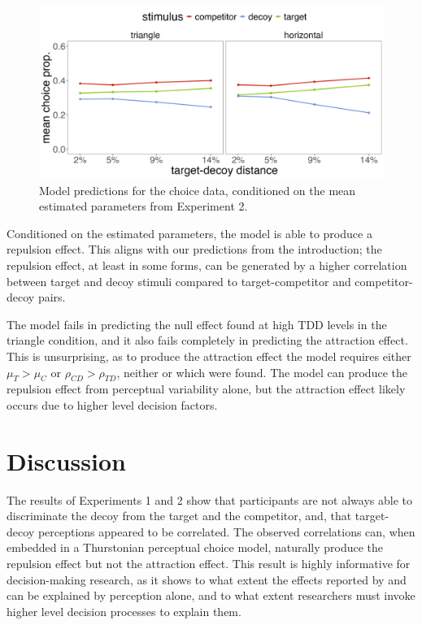 \begin{figure}
   \includegraphics[width=\textwidth]{figures/bayes_circle_area_sim_choice_sigma_constant_comp_effect.jpeg}
   \caption{Model predictions for the choice data, conditioned on the mean estimated parameters from Experiment 2.}
   \label{fig:e2_model_preds}
\end{figure}

Conditioned on the estimated parameters, the model is able to produce a repulsion effect. This aligns with our predictions from the introduction; the repulsion effect, at least in some forms, can be generated by a higher correlation between target and decoy stimuli compared to target-competitor and competitor-decoy pairs.

The model fails in predicting the null effect found at high TDD levels in the triangle condition, and it also fails completely in predicting the attraction effect. This is unsurprising, as to produce the attraction effect the model requires either $\mu_{T}>\mu_{C}$ or $\rho_{CD}>\rho_{TD}$, neither or which were found. The model can produce the repulsion effect from perceptual variability alone, but the attraction effect likely occurs due to higher level decision factors.

\section{Discussion}

The results of Experiments 1 and 2 show that participants are not always able to discriminate the decoy from the target and the competitor, and, that target-decoy perceptions appeared to be correlated. The observed correlations can, when embedded in a Thurstonian perceptual choice model, naturally produce the repulsion effect but not the attraction effect. This result is highly informative for decision-making research, as it shows to what extent the effects reported by \textcite{trueblood2013not} and \textcite{spektorWhenGoodLooks2018b} can be explained by perception alone, and to what extent researchers must invoke higher level decision processes to explain them. 

